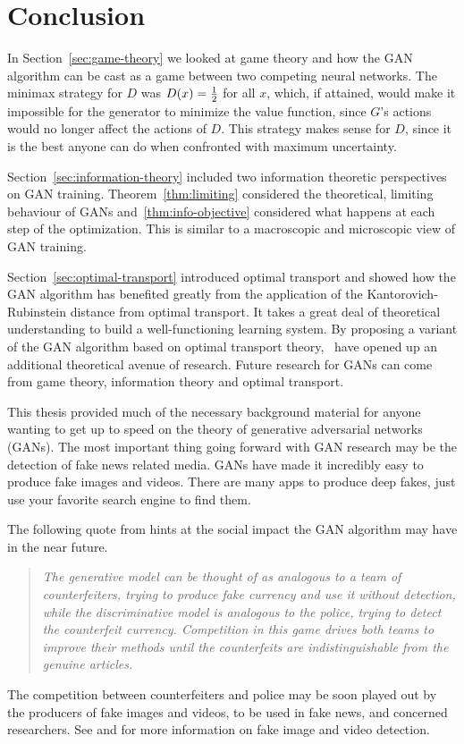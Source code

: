 \section{Conclusion}

In Section~\ref{sec:game-theory} we looked at game theory and how the GAN
algorithm can be cast as a game between two competing neural networks. The
minimax strategy for $D$ was $D(x) = {1 \over 2}$ for all $x$, which, if
attained, would make it impossible for the generator to minimize the value
function, since $G$'s actions would no longer affect the actions of $D$. This
strategy makes sense for $D$, since it is the best anyone can do when confronted
with maximum uncertainty.

Section~\ref{sec:information-theory} included two information theoretic
perspectives on GAN training. Theorem~\ref{thm:limiting} considered the
theoretical, limiting behaviour of GANs and~\ref{thm:info-objective} considered
what happens at each step of the optimization. This is similar to a macroscopic
and microscopic view of GAN training.

Section~\ref{sec:optimal-transport} introduced optimal transport and showed how
the GAN algorithm has benefited greatly from the application of the
Kantorovich-Rubinstein distance from optimal transport. It takes a great deal of
theoretical understanding to build a well-functioning learning system. By
proposing a variant of the GAN algorithm based on optimal transport
theory,~\cite{ref:arjovsky-2017} have opened up an additional theoretical avenue
of research. Future research for GANs can come from game theory, information
theory and optimal transport.

This thesis provided much of the necessary background material for anyone
wanting to get up to speed on the theory of generative adversarial networks
(GANs). The most important thing going forward with GAN research may be the
detection of fake news related media. GANs have made it incredibly easy to
produce fake images and videos. There are many apps to produce deep fakes, just
use your favorite search engine to find them.

The following quote from \cite{ref:goodfellow-original} hints at the social
impact the GAN algorithm may have in the near future.

\begin{quote}
  \itshape The generative model can be thought of as analogous to a team of
  counterfeiters, trying to produce fake currency and use it without detection,
  while the discriminative model is analogous to the police, trying to detect
  the counterfeit currency. Competition in this game drives both teams to
  improve their methods until the counterfeits are indistinguishable from the
  genuine articles.
\end{quote}

The competition between counterfeiters and police may be soon played out by the
producers of fake images and videos, to be used in fake news, and concerned
researchers. See 
\cite{ref:df11} and \cite{ref:df12} for more information on fake image and video
detection.

